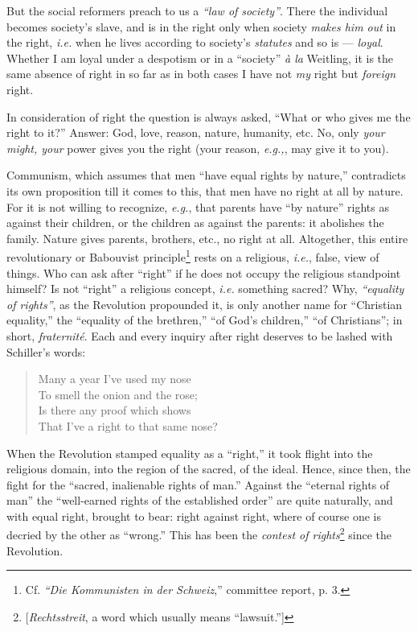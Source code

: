 But the social reformers preach to us a \textit{``law of society''}. There 
the individual becomes society's slave, and is in the right only when society 
\textit{makes him out} in the right, \textit{i.e.} when he lives according to 
society's \textit{statutes} and so is --- \textit{loyal}. Whether I am loyal 
under a despotism or in a ``society'' \textit{\`a la} Weitling, it is the 
same absence of right in so far as in both cases I have not \textit{my} right 
but \textit{foreign} right.

In consideration of right the question is always asked, ``What or who gives 
me the right to it?'' Answer: God, love, reason, nature, humanity, etc. No, 
only \textit{your might, your} power gives you the right (your reason, 
\textit{e.g.,}, may give it to you).

Communism, which assumes that men ``have equal rights by nature,'' 
contradicts its own proposition till it comes to this, that men have no right 
at all by nature. For it is not willing to recognize, \textit{e.g.}, that 
parents have ``by nature'' rights as against their children, or the children 
as against the parents: it abolishes the family. Nature gives parents, 
brothers, etc., no right at all. Altogether, this entire revolutionary or 
Babouvist principle\footnote{Cf. \textit{``Die Kommunisten in der 
Schweiz},'' committee report, p. 3.} rests on a religious, \textit{i.e.}, 
false, view of things. Who can ask after ``right'' if he does not occupy the 
religious standpoint himself? Is not ``right'' a religious concept, 
\textit{i.e.} something sacred? Why, \textit{``equality of rights''}, as the 
Revolution propounded it, is only another name for ``Christian equality,'' 
the ``equality of the brethren,'' ``of God's children,'' ``of 
Christians''; in short, \textit{fraternit\'e}. Each and every inquiry after 
right deserves to be lashed with Schiller's words:

\begin{quotation}

\noindent{} Many a year I've used my nose\\
 To smell the onion and the rose;\\
 Is there any proof which shows\\
 That I've a right to that same nose? \end{quotation}

\noindent{}When the Revolution stamped equality as a ``right,'' it took 
flight into the religious domain, into the region of the sacred, of the ideal. 
Hence, since then, the fight for the ``sacred, inalienable rights of man.'' 
Against the ``eternal rights of man'' the ``well-earned rights of the 
established order'' are quite naturally, and with equal right, brought to 
bear: right against right, where of course one is decried by the other as 
``wrong.'' This has been the \textit{contest of 
rights}\footnote{[\textit{Rechtsstreit}, a word which usually means 
``lawsuit.'']} since the Revolution.

